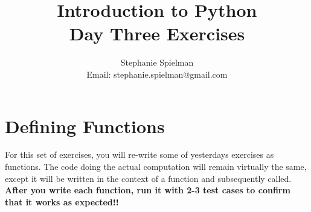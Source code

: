 \documentclass{article}[12pt]
\begin{document}
\title{Introduction to Python \\ Day Three Exercises}
\author{Stephanie Spielman \\ \footnotesize{Email: stephanie.spielman@gmail.com}}
\date{}
\maketitle{}

\section{Defining Functions}

For this set of exercises, you will re-write some of yesterday\textquotesingle s exercises as functions. The code doing the actual computation will remain virtually the same, except it will be written in the context of a function and subsequently called. \textbf{ After you write each function, run it with 2-3 test cases to confirm that it works as expected!!}
\end{document}
